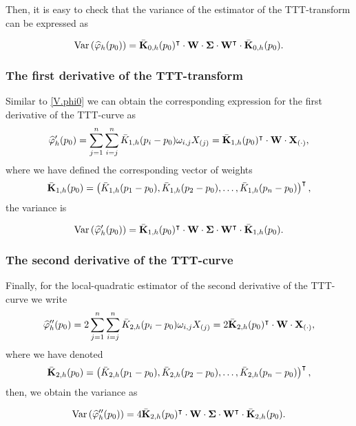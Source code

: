 \documentclass[preprint,12pt]{elsarticle}
\begin{document}
Then, it is easy to check that the variance of the estimator of the TTT-transform can be expressed as 

\begin{equation}\label{V.phi0}
{\rm Var} \left(\widehat{\varphi}_h(p_0)\right)= \bar{\bf K}_{0,h}(p_0)^{\intercal}\cdot {\bf W} \cdot {\boldsymbol{\Sigma}}\cdot  {\bf W}^{\intercal}\cdot \bar{\bf K}_{0,h}(p_0).
\end{equation}


\subsubsection*{The first derivative of the TTT-transform}


\noindent Similar to \eqref{V.phi0}  we can obtain the corresponding expression for the first derivative of the TTT-curve as
\begin{equation*}
\widehat{\varphi}'_h(p_0)=  \sum_{j=1}^n \sum_{i=j}^n \bar{K}_{1,h}(p_i-p_0)\omega_{i,j}X_{(j)}=\bar{\bf K}_{1,h}(p_0)^{\intercal} \cdot {\bf W} \cdot{\bf X}_{(\cdot)}, 
\end{equation*}
where we have defined the corresponding vector of weights 
$$\bar{\bf K}_{1,h}(p_0)=\left(\bar{ K}_{1,h}(p_1-p_0), \bar{ K}_{1,h}(p_2-p_0),\ldots,\bar{ K}_{1,h}(p_n-p_0)\right)^{\intercal},$$
the variance is 

\begin{equation}\label{V.phi1}
{\rm Var} \left(\widehat{\varphi}'_h(p_0)\right)= \bar{\bf K}_{1,h}(p_0)^{\intercal}\cdot {\bf W} \cdot {\boldsymbol{\Sigma}}\cdot  {\bf W}^{\intercal}\cdot \bar{\bf K}_{1,h}(p_0).
\end{equation}
\subsubsection*{The second derivative of the TTT-curve}
\noindent Finally, for the local-quadratic estimator of the second derivative of the TTT-curve we write
\begin{equation*}
\widehat{\varphi}''_h(p_0)= 2 \sum_{j=1}^n \sum_{i=j}^n \bar{K}_{2,h}(p_i-p_0)\omega_{i,j}X_{(j)}=2 \bar{\bf K}_{2,h}(p_0)^{\intercal} \cdot {\bf W} \cdot{\bf X}_{(\cdot)}, 
\end{equation*}
where we have denoted 
$$\bar{\bf K}_{2,h}(p_0)=\left(\bar{ K}_{2,h}(p_1-p_0), \bar{ K}_{2,h}(p_2-p_0),\ldots,\bar{ K}_{2,h}(p_n-p_0)\right)^{\intercal},$$
then,  we obtain the variance as 

\begin{equation}\label{V.phi2}
{\rm Var} \left(\widehat{\varphi}''_h(p_0)\right)=4  \bar{\bf K}_{2,h}(p_0)^{\intercal}\cdot {\bf W} \cdot {\boldsymbol{\Sigma}}\cdot  {\bf W}^{\intercal}\cdot \bar{\bf K}_{2,h}(p_0).
\end{equation}
\end{document}
